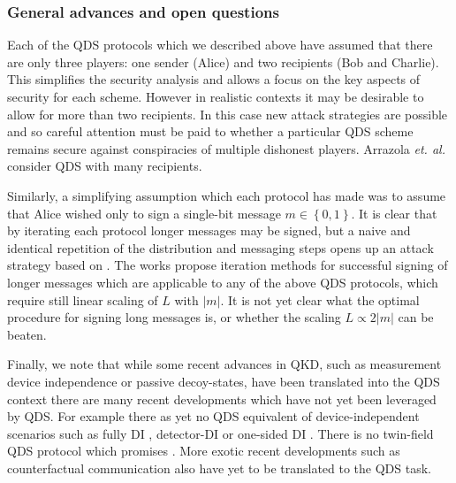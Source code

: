 \subsubsection*{General advances and open questions}
Each of the QDS protocols which we described above have assumed that there are only three players: one sender (Alice) and two recipients (Bob and Charlie). This simplifies the security analysis and allows a focus on the key aspects of security for each scheme. However in realistic contexts it may be desirable to allow for more than two recipients. In this case new attack strategies are possible and so careful attention must be paid to whether a particular QDS scheme remains secure against conspiracies of multiple dishonest players. Arrazola \emph{et. al.} \cite{Arrazola2015} consider QDS with many recipients. 

Similarly, a simplifying assumption which each protocol has made was to assume that Alice wished only to sign a single-bit message $m \in \left\{0, 1\right\}$. It is clear that by iterating each protocol longer messages may be signed, but a naive and identical repetition of the distribution and messaging steps opens up an attack strategy based on . The works \cite{Wang2015, Wang2017} propose iteration methods for successful signing of longer messages which are applicable to any of the above QDS protocols, which require still linear scaling of $L$ with $\left|m\right|$. It is not yet clear what the optimal procedure for signing long messages is, or whether the scaling $L \propto 2 \left|m\right|$ can be beaten.

Finally, we note that while some recent advances in QKD, such as measurement device independence or passive decoy-states, have been translated into the QDS context there are many recent developments which have not yet been leveraged by QDS. For example there as yet no QDS equivalent of device-independent scenarios such as fully DI , detector-DI  or one-sided DI . There is no twin-field  QDS protocol which promises . More exotic recent developments such as counterfactual communication  also have yet to be translated to the QDS task. 

